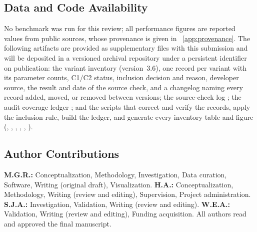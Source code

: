 \subsection*{Data and Code Availability}
No benchmark was run for this review; all performance figures are reported values from public sources, whose provenance is given in \suppsec~\ref{app:provenance}. The following artifacts are provided as supplementary files with this submission and will be deposited in a versioned archival repository under a persistent identifier on publication: the variant inventory  (version~3.6), one record per variant with its parameter counts, C1/C2 status, inclusion decision and reason, developer source, the result and date of the source check, and a changelog naming every record added, moved, or removed between versions; the source-check log ; the audit coverage ledger ; and the scripts that correct and verify the records, apply the inclusion rule, build the ledger, and generate every inventory table and figure (, , , , , ).

\subsection*{Author Contributions}
\textbf{M.G.R.:} Conceptualization, Methodology, Investigation, Data curation, Software, Writing (original draft), Visualization.
\textbf{H.A.:} Conceptualization, Methodology, Writing (review and editing), Supervision, Project administration.
\textbf{S.J.A.:} Investigation, Validation, Writing (review and editing).
\textbf{W.E.A.:} Validation, Writing (review and editing), Funding acquisition.
All authors read and approved the final manuscript.
